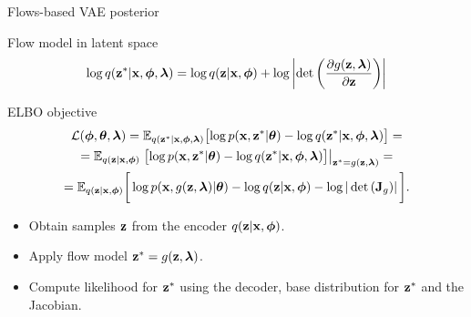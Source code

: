 \begin{frame}{Flows-based VAE posterior}
	
	\begin{block}{Flow model in latent space}
		\vspace{-0.3cm}
		\[
			\log q(\mathbf{z}^* | \mathbf{x}, \boldsymbol{\phi}, \boldsymbol{\lambda}) = \log q(\mathbf{z} | \mathbf{x}, \boldsymbol{\phi}) + \log \left| \det \left( \frac{\partial g(\mathbf{z}, \boldsymbol{\lambda})}{\partial \mathbf{z}}\right)\right|
		\]
		\vspace{-0.3cm}
	\end{block}
	\begin{block}{ELBO objective}
		\vspace{-0.5cm}
		\begin{multline*}
			\mathcal{L} (\boldsymbol{\phi}, \boldsymbol{\theta}, \boldsymbol{\lambda})  
			= \mathbb{E}_{q(\mathbf{z}^* | \mathbf{x}, \boldsymbol{\phi}, \boldsymbol{\lambda})} \bigl[\log p(\mathbf{x}, \mathbf{z}^* | \boldsymbol{\theta}) - \log q(\mathbf{z}^*| \mathbf{x}, \boldsymbol{\phi}, \boldsymbol{\lambda}) \bigr] = \\
			= \mathbb{E}_{q(\mathbf{z} | \mathbf{x}, \boldsymbol{\phi})} \left. \bigl[\log p(\mathbf{x}, \mathbf{z}^* | \boldsymbol{\theta}) - \log q(\mathbf{z}^*| \mathbf{x}, \boldsymbol{\phi}, \boldsymbol{\lambda}) \bigr]\right|_{\mathbf{z}^* = g(\mathbf{z}, \boldsymbol{\lambda})} = \\
			= \mathbb{E}_{q(\mathbf{z} | \mathbf{x}, \boldsymbol{\phi})} \bigg[\log p(\mathbf{x}, g(\mathbf{z}, \boldsymbol{\lambda}) | \boldsymbol{\theta}) -  \log q(\mathbf{z} | \mathbf{x}, \boldsymbol{\phi} ) - \log | \det \left( \mathbf{J}_g ) \right| \bigg].
		\end{multline*}
	\end{block}
	\begin{itemize}
		\item Obtain samples $\mathbf{z}$ from the encoder $q(\mathbf{z} | \mathbf{x}, \boldsymbol{\phi})$.
		\item Apply flow model $\mathbf{z}^* = g(\mathbf{z}, \boldsymbol{\lambda})$.
		\item Compute likelihood for $\mathbf{z}^*$ using the decoder, base distribution for $\mathbf{z}^*$ and the Jacobian.
	\end{itemize}
\end{frame}
